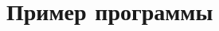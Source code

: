\documentclass[a4paper, 12pt]{article}
\begin{document}
%
%
%	

\section{Пример программы}
\end{document}
